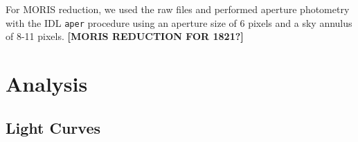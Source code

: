 \documentclass[twocolumn]{aastex6}
\begin{document}
For MORIS reduction, we used the raw files and performed aperture photometry with the IDL \texttt{aper} procedure using an aperture size of 6 pixels and a sky annulus of 8-11 pixels.
{\bf [MORIS REDUCTION FOR 1821?]}

\section{Analysis}\label{sec:analysis}

\subsection{Light Curves}

\begin{figure}[!t]
\centering
{}
\end{figure}
\end{document}

